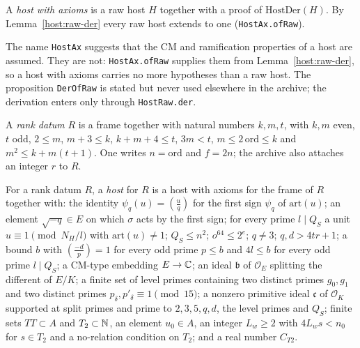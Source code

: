 \begin{definition}\label{host:host-ax}
A \emph{host with axioms} is a raw host $H$ together with a proof of
$\mathrm{HostDer}(H)$. By Lemma~\ref{host:raw-der} every raw host extends
to one (\texttt{HostAx.ofRaw}).
\end{definition}

\begin{remark}\label{host:rem-der}
The name \texttt{HostAx} suggests that the CM and ramification properties
of a host are assumed. They are not: \texttt{HostAx.ofRaw} supplies them
from Lemma~\ref{host:raw-der}, so a host with axioms carries no more
hypotheses than a raw host. The proposition \texttt{DerOfRaw} is stated
but never used elsewhere in the archive; the derivation enters only through
\texttt{HostRaw.der}.
\end{remark}

\begin{definition}[ranks]\label{host:ranks}
A \emph{rank datum} $R$ is a frame together with natural numbers $k,m,t$,
with $k,m$ even, $t$ odd, $2\le m$, $m+3\le k$, $k+m+4\le t$, $3m<t$,
$m\le2\,\mathrm{ord}\le k$ and $m^2\le k+m(t+1)$. One writes $n=\mathrm{ord}$
and $f=2n$; the archive also attaches an integer $r$ to $R$.
\end{definition}

\begin{definition}\label{host:host-full}
For a rank datum $R$, a \emph{host} for $R$ is a host with axioms for the
frame of $R$ together with: the identity $\psi_q(u)=\left(\frac uq\right)$
for the first sign $\psi_q$ of $\mathrm{art}(u)$; an element $\sqrt{-q}\in
E$ on which $\sigma$ acts by the first sign; for every prime $l\mid Q_S$ a
unit $u\equiv1\pmod{N_H/l}$ with $\mathrm{art}(u)\neq1$; $Q_S\le n^2$;
$o^{64}\le2^e$; $q\ne3$; $q,d>4tr+1$; a bound $b$ with
$\left(\frac{-d}{p}\right)=1$ for every odd prime $p\le b$ and $4l\le b$
for every odd prime $l\mid Q_S$; a CM-type embedding $E\to\mathbb{C}$; an ideal
$\mathfrak b$ of $\mathcal O_E$ splitting the different of $E/K$; a finite
set of level primes containing two distinct primes $g_0,g_1$ and two
distinct primes $p_{\delta},p'_{\delta}\equiv1\pmod{15}$; a nonzero primitive
ideal $\mathfrak c$ of $\mathcal O_K$ supported at split primes and prime to
$2,3,5,q,d$, the level primes and $Q_S$; finite sets $TT\subset A$ and
$T_2\subset\mathbb{N}$, an element $u_0\in A$, an integer $L_w\ge2$ with
$4L_ws<n_0$ for $s\in T_2$ and a no-relation condition on $T_2$; and a real
number $C_{T2}$.
\end{definition}


